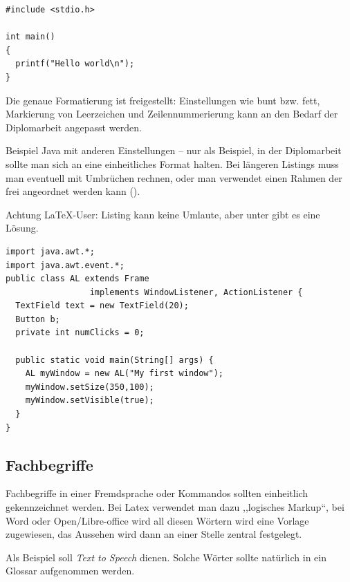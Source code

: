 \documentclass[a4paper,ngerman,naustrian,DIV=12,BCOR=1cm]{scrbook}
\begin{document}
\begin{lstlisting} 
#include <stdio.h>

int main() 
{ 
  printf("Hello world\n"); 
} 
\end{lstlisting} 

Die genaue Formatierung ist freigestellt: Einstellungen wie bunt bzw.
fett, Markierung von Leerzeichen und Zeilennummerierung kann an den
Bedarf der Diplomarbeit angepasst werden. 

Beispiel Java mit anderen Einstellungen -- nur als Beispiel, in der
Diplomarbeit sollte man sich an eine einheitliches Format halten.
Bei längeren Listings muss man eventuell mit Umbrüchen rechnen, oder
man verwendet einen Rahmen der frei angeordnet werden kann ().

\lstset{numbers=right, numberstyle=\tiny, stepnumber=2, numbersep=5pt, showspaces=false, frame=single}
\lstset{language=Java}

Achtung \LaTeX{}-User: Listing kann keine Umlaute, aber unter \cite{listingtipp}
gibt es eine Lösung.

\begin{lstlisting}[caption={Java Beispiel},captionpos=b]
import java.awt.*;  
import java.awt.event.*;
public class AL extends Frame
                 implements WindowListener, ActionListener {
  TextField text = new TextField(20);
  Button b;    
  private int numClicks = 0;
 
  public static void main(String[] args) {
    AL myWindow = new AL("My first window");
    myWindow.setSize(350,100);
    myWindow.setVisible(true);    
  } 
}
\end{lstlisting}


\subsection{Fachbegriffe}

Fachbegriffe in einer Fremdsprache oder Kommandos sollten einheitlich
gekennzeichnet werden. Bei Latex verwendet man dazu ,,logisches Markup``,
bei Word oder Open/Libre-office wird all diesen Wörtern wird eine
Vorlage zugewiesen, das Aussehen wird dann an einer Stelle zentral
festgelegt. 

Als Beispiel soll \emph{Text to Speech}
dienen. Solche Wörter sollte natürlich in ein Glossar aufgenommen
werden. 
\end{document}
